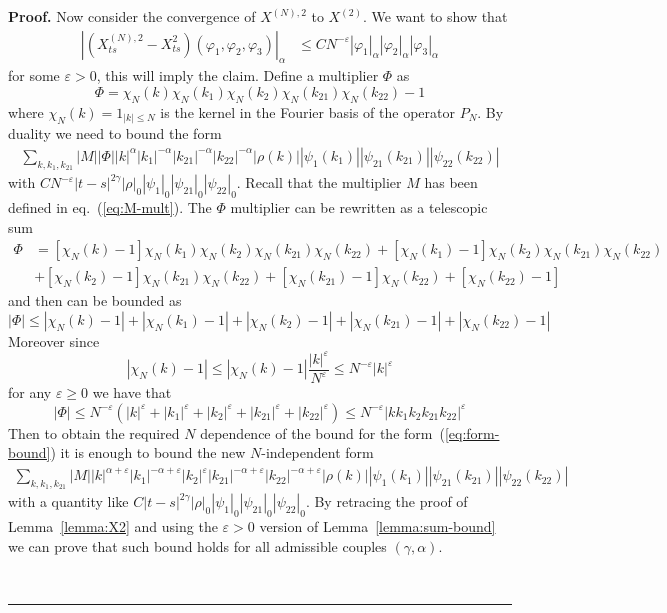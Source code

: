 \documentclass[a4paper,11pt,reqno]{article}
\newcommand{\eps}{\varepsilon}
\newenvironment{proof}[1][Proof]{\textbf{#1.} }{\ \rule{0.5em}{0.5em}}
\begin{document}
\begin{proof}
Now consider the convergence of $X^{(N),2}$ to $X^{(2)}$. We want to show that
\begin{equation}
\label{eq:gal-X2-1}
  \begin{split}
 | (X^{(N),2}_{ts}-X^2_{ts})(\varphi_1,\varphi_2,\varphi_3)|_{\alpha} & \le C N^{-\eps} |\varphi_1|_{\alpha} |\varphi_2|_{\alpha} |\varphi_3|_{\alpha}
  \end{split}
\end{equation}
for some $\eps > 0$, this will imply the claim. 
Define a multiplier $\Phi$ as
$$
\Phi =  \chi_N(k) \chi_N(k_1) \chi_N(k_2) \chi_N(k_{21}) \chi_N(k_{22})-1  
$$
where $\chi_N(k) = 1_{|k|\le N}$ is the kernel in the Fourier basis of the  operator $P_N$.
By duality we need to bound the form
\begin{equation}
\label{eq:form-bound}
  \begin{split}
\sum_{k,k_1,k_{21}} |M| |\Phi| |k|^{\alpha} |k_1|^{-\alpha}
|k_{21}|^{-\alpha} |k_{22}|^{-\alpha} |\rho(k)| |\psi_1(k_1)|   |\psi_{21}(k_{21})|  |\psi_{22}(k_{22})|  
  \end{split}
\end{equation}
with $C N^{-\eps} |t-s|^{2\gamma} |\rho|_0 |\psi_1|_0 |\psi_{21}|_0 |\psi_{22}|_0$. Recall that the multiplier $M$ has been defined in eq.~(\ref{eq:M-mult}). 
The $\Phi$ multiplier can be rewritten as a telescopic sum
\begin{equation*}
  \begin{split}
\Phi & = [\chi_N(k)-1] \chi_N(k_1) \chi_N(k_2) \chi_N(k_{21}) \chi_N(k_{22}) +
[\chi_N(k_1)-1] \chi_N(k_2) \chi_N(k_{21}) \chi_N(k_{22})
\\ & +  [\chi_N(k_2)-1] \chi_N(k_{21}) \chi_N(k_{22}) +  [\chi_N(k_{21})-1] \chi_N(k_{22}) + [\chi_N(k_{22})-1]    
  \end{split}
\end{equation*}
and then can be bounded as
$$
|\Phi| \le |\chi_N(k)-1|+|\chi_N(k_1)-1|+|\chi_N(k_2)-1|+|\chi_N(k_{21})-1|+|\chi_N(k_{22})-1|
$$
Moreover since
$$
|\chi_N(k)-1| \le |\chi_N(k)-1| \frac{|k|^\eps}{N^\eps} \le N^{-\eps} |k|^\eps 
$$
for any $\eps \ge 0$ we have that
$$
|\Phi| \le N^{-\eps}(|k|^\eps+|k_{1}|^\eps+|k_{2}|^\eps+|k_{21}|^\eps+|k_{22}|^\eps)
\le N^{-\eps} |k k_1 k_2 k_{21} k_{22}|^\eps
$$
Then to obtain the required $N$ dependence of the bound for the form~(\ref{eq:form-bound}) it is enough to bound the new $N$-independent  form
\begin{equation}
\label{eq:form-bound-new}
  \begin{split}
\sum_{k,k_1,k_{21}} |M|  |k|^{\alpha+\eps} |k_1|^{-\alpha+\eps} |k_2|^{\eps}
|k_{21}|^{-\alpha+\eps} |k_{22}|^{-\alpha+\eps} |\rho(k)| |\psi_1(k_1)|   |\psi_{21}(k_{21})|  |\psi_{22}(k_{22})|  
  \end{split}
\end{equation}
with a quantity like $C  |t-s|^{2\gamma} |\rho|_0 |\psi_1|_0 |\psi_{21}|_0 |\psi_{22}|_0$. By retracing the proof of Lemma~\ref{lemma:X2} and using the $\eps>0$ version of Lemma~\ref{lemma:sum-bound} we can prove that such bound holds for all admissible couples $(\gamma,\alpha)$. 


\end{proof}
\end{document}
